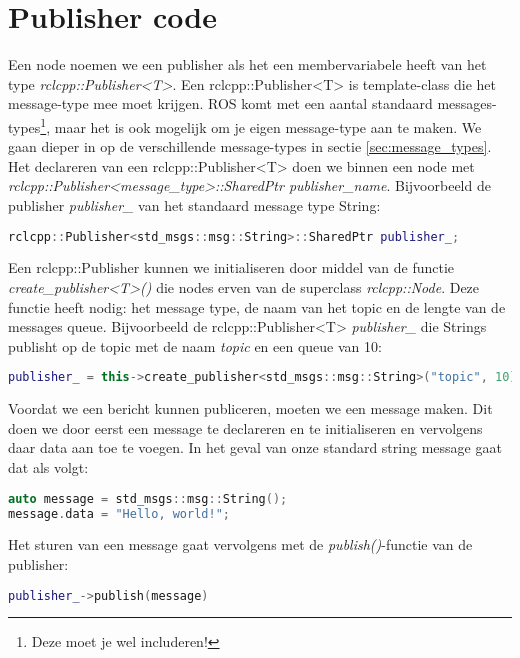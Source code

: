 \section{Publisher code}
\label{sec:publisher}
Een node noemen we een publisher als het een membervariabele heeft van het type \textit{rclcpp::Publisher<T>}. Een rclcpp::Publisher<T> is template-class die het message-type mee moet krijgen. ROS komt met een aantal standaard messages-types\footnote{Deze moet je wel includeren!}, maar het is ook mogelijk om je eigen message-type aan te maken. We gaan dieper in op de verschillende message-types in sectie \ref{sec:message_types}. Het declareren van een rclcpp::Publisher<T> doen we binnen een node met \textit{rclcpp::Publisher<message\_type>::SharedPtr publisher\_name}. Bijvoorbeeld de publisher \textit{publisher\_} van het standaard message type String:

\begin{lstlisting}[language=C++, firstnumber=0, label={}, caption={Een publisher met het message type \textit{std\_msgs::msg::String}.}]
rclcpp::Publisher<std_msgs::msg::String>::SharedPtr publisher_;
\end{lstlisting}

\noindent Een rclcpp::Publisher kunnen we initialiseren door middel van de functie \textit{create\_publisher<T>()} die nodes erven van de superclass \textit{rclcpp::Node}. Deze functie heeft nodig: het message type, de naam van het topic en de lengte van de messages queue. Bijvoorbeeld de rclcpp::Publisher<T> \textit{publisher\_} die Strings publisht op de topic met de naam \textit{topic} en een queue van 10:
\begin{lstlisting}[language=C++, firstnumber=0, label={}]
publisher_ = this->create_publisher<std_msgs::msg::String>("topic", 10);
\end{lstlisting}

\noindent Voordat we een bericht kunnen publiceren, moeten we een message maken. Dit doen we door eerst een message te declareren en te initialiseren en vervolgens daar data aan toe te voegen. In het geval van onze standard string message gaat dat als volgt:
\begin{lstlisting}[language=C++, firstnumber=0, label={}]
auto message = std_msgs::msg::String();
message.data = "Hello, world!";
\end{lstlisting}
\noindent Het sturen van een message gaat vervolgens met de \textit{publish()}-functie van de publisher:
\begin{lstlisting}[language=C++, firstnumber=0, label={}]
publisher_->publish(message)
\end{lstlisting}

